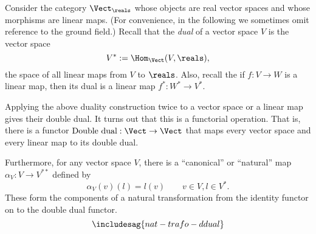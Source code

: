 \begin{example}
  Consider the category $\Vect_{\reals}$ whose objects are real vector spaces and whose morphisms are linear maps. (For convenience, in the following we sometimes omit reference to the ground field.) Recall that the \emph{dual} of a vector space $V$ is the vector space
  \[
    V^* := \Hom_{\Vect}(V, \reals),
  \]
   the space of all linear maps from $V$ to $\reals$. Also, recall the if $f: V \rightarrow W$ is a linear map, then its dual is a linear map $f^*: W^* \rightarrow V^*$.

  Applying the above duality construction twice to a vector space or a linear map gives their double dual. It turns out that this is a functorial operation. That is, there is a functor $\text{Double dual}: \Vect \rightarrow \Vect$ that maps every vector space and every linear map to its double dual.

  Furthermore, for any vector space $V$, there is a ``canonical'' or ``natural'' map $\alpha_V : V \rightarrow V^{**}$ defined by
  \[
    \alpha_V(v)(l) = l(v) \quad \quad  v \in V, l \in V^*.
  \]
  These form the components of a natural transformation from the identity functor on \Vect to the double dual functor.
  \begin{equation}
    \includesag{nat-trafo-ddual}
  \end{equation}
\end{example}



